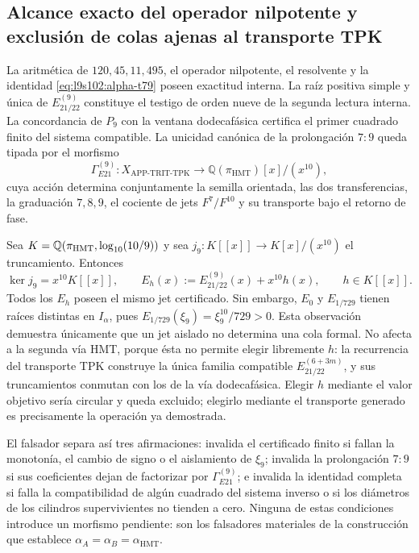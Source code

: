 \subsection{Alcance exacto del operador nilpotente y exclusión de colas ajenas al transporte TPK}
\label{sec:l9s102:alpha-alcance}

La aritmética de \(120,45,11,495\), el operador nilpotente, el resolvente y
la identidad \cref{eq:l9s102:alpha-t79} poseen exactitud interna. La raíz
positiva simple y única de \(E_{21/22}^{(9)}\) constituye el testigo de orden
nueve de la segunda lectura interna. La concordancia de \(P_9\) con la
ventana dodecafásica certifica el primer cuadrado finito del sistema
compatible. La unicidad canónica de la prolongación \(7{:}9\) queda tipada
por el morfismo
\begin{equation}
 \Gamma_{E21}^{(9)}:
 X_{\mathrm{APP\text{-}TRIT\text{-}TPK}}
 \longrightarrow \mathbb Q(\pi_{\mathrm{HMT}})[x]/(x^{10}),
 \label{eq:l9s102:alpha-gamma-e21}
\end{equation}
cuya acción determina conjuntamente la semilla orientada, las dos
transferencias, la graduación \(7,8,9\), el cociente de jets
\(F^7/F^{10}\) y su transporte bajo el retorno de fase.

Sea \(K=\mathbb Q(\pi_{\rm HMT},\log_{10}(10/9))\) y sea
\(j_9:K[[x]]\to K[x]/(x^{10})\) el truncamiento. Entonces
\begin{equation}
 \ker j_9=x^{10}K[[x]],
 \qquad
 E_h(x):=E_{21/22}^{(9)}(x)+x^{10}h(x),
 \qquad h\in K[[x]].
\label{eq:l9s102:alpha-limite-jets-e21}
\end{equation}
Todos los \(E_h\) poseen el mismo jet certificado. Sin embargo,
\(E_0\) y \(E_{1/729}\) tienen raíces distintas en \(I_\alpha\), pues
\(E_{1/729}(\xi_9)=\xi_9^{10}/729>0\). Esta observación demuestra únicamente
que un jet aislado no determina una cola formal. No afecta a la segunda vía
HMT, porque ésta no permite elegir libremente \(h\): la recurrencia del
transporte TPK construye la única familia compatible
\(E_{21/22}^{(6+3m)}\), y sus truncamientos conmutan con los de la vía
dodecafásica. Elegir \(h\) mediante el valor objetivo sería circular y queda
excluido; elegirlo mediante el transporte generado es precisamente la
operación ya demostrada.

El falsador separa así tres afirmaciones: invalida el certificado finito si
fallan la monotonía, el cambio de signo o el aislamiento de \(\xi_9\);
invalida la prolongación \(7{:}9\) si sus coeficientes dejan de factorizar por
\(\Gamma_{E21}^{(9)}\); e invalida la identidad completa si falla la
compatibilidad de algún cuadrado del sistema inverso o si los diámetros de
los cilindros supervivientes no tienden a cero. Ninguna de estas condiciones
introduce un morfismo pendiente: son los falsadores materiales de la
construcción que establece
\(\alpha_A=\alpha_B=\alpha_{\mathrm{HMT}}\).
